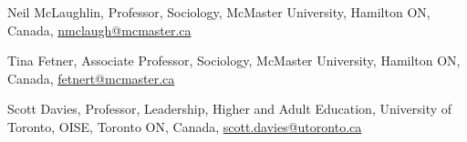 \documentclass[9pt,usenames,dvipsnames]{article}
\begin{document}

\ind Neil McLaughlin, Professor, Sociology, McMaster University, Hamilton ON, Canada, \href{mailto:nmclaugh@mcmaster.ca}{nmclaugh@mcmaster.ca}

\ind Tina Fetner, Associate Professor, Sociology, McMaster University, Hamilton ON, Canada, \href{mailto:fetnert@mcmaster.ca}{fetnert@mcmaster.ca}

\ind Scott Davies, Professor, Leadership, Higher and Adult Education, University of Toronto, OISE, Toronto ON, Canada, \href{mailto:scott.davies@utoronto.ca}{scott.davies@utoronto.ca}
\end{document}
